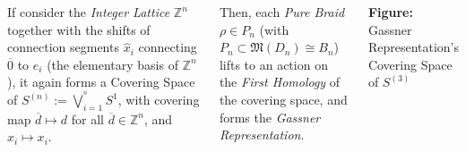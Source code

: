 \documentclass[25 pt,margin=0.9in,innermargin=-4.5in,blockverticalspace=-0.25in]{tikzposter}
\begin{document}
\begin{columns}
{        If consider the \emph{Integer Lattice} $\mathbb{Z}^n$ together with the shifts of connection segments $\hat{x}_i$ connecting $\overline{0}$ to $e_i$ (the elementary basis of $\mathbb{Z}^n$), it again forms a Covering Space of $S^{(n)}:=\bigvee_{i=1}^{^n}S^1$, with covering map $\overline{d}\mapsto d$ for all $\overline{d}\in\mathbb{Z}^n$, and $\hat{x}_i \mapsto x_i$.

        \hfil

        Then, each \emph{Pure Braid} $\rho \in P_n$ (with $P_n \subset \mathfrak{M}(D_n)\cong B_n$)  lifts to an action on the \emph{First Homology} of the covering space, and forms the \emph{Gassner Representation}.
        \begin{center}

            \textbf{Figure:} Gassner Representation's Covering Space of $S^{(3)}$
        \end{center}
    }

\end{columns}
\end{document}

